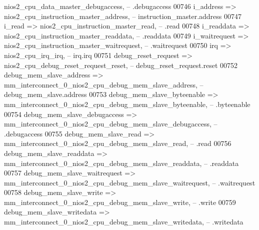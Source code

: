 \begin{DoxyCode}
      nios2_cpu_data_master_debugaccess,\textcolor{keyword}{                       --                          .debugaccess}
00746             i\_address                           => 
      nios2_cpu_instruction_master_address,\textcolor{keyword}{                    --        instruction\_master.address}
00747             i\_read                              => 
      nios2_cpu_instruction_master_read,\textcolor{keyword}{                       --                          .read}
00748             i\_readdata                          => 
      nios2_cpu_instruction_master_readdata,\textcolor{keyword}{                   --                          .readdata}
00749             i\_waitrequest                       => 
      nios2_cpu_instruction_master_waitrequest,\textcolor{keyword}{                --                          .waitrequest}
00750             irq                                 => nios2_cpu_irq_irq,\textcolor{keyword}{                                      
       --                       irq.irq}
00751             debug\_reset\_request                 => 
      nios2_cpu_debug_reset_request_reset,\textcolor{keyword}{                     --       debug\_reset\_request.reset}
00752             debug\_mem\_slave\_address             => 
      mm_interconnect_0_nios2_cpu_debug_mem_slave_address,\textcolor{keyword}{     --           debug\_mem\_slave.address}
00753             debug\_mem\_slave\_byteenable          => 
      mm_interconnect_0_nios2_cpu_debug_mem_slave_byteenable,\textcolor{keyword}{  --                          .byteenable}
00754             debug\_mem\_slave\_debugaccess         => 
      mm_interconnect_0_nios2_cpu_debug_mem_slave_debugaccess,\textcolor{keyword}{ --                          .debugaccess}
00755             debug\_mem\_slave\_read                => 
      mm_interconnect_0_nios2_cpu_debug_mem_slave_read,\textcolor{keyword}{        --                          .read}
00756             debug\_mem\_slave\_readdata            => 
      mm_interconnect_0_nios2_cpu_debug_mem_slave_readdata,\textcolor{keyword}{    --                          .readdata}
00757             debug\_mem\_slave\_waitrequest         => 
      mm_interconnect_0_nios2_cpu_debug_mem_slave_waitrequest,\textcolor{keyword}{ --                          .waitrequest}
00758             debug\_mem\_slave\_write               => 
      mm_interconnect_0_nios2_cpu_debug_mem_slave_write,\textcolor{keyword}{       --                          .write}
00759             debug\_mem\_slave\_writedata           => 
      mm_interconnect_0_nios2_cpu_debug_mem_slave_writedata,\textcolor{keyword}{   --                          .writedata}

\end{DoxyCode}
